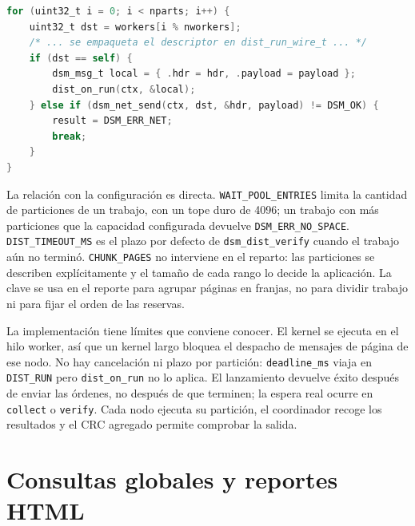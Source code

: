 \documentclass[11pt,spanish]{article}
\begin{document}
\begin{lstlisting}[language=C, caption={Reparto de particiones y ejecución local del coordinador.}, label={lst:dist}]
for (uint32_t i = 0; i < nparts; i++) {
    uint32_t dst = workers[i % nworkers];
    /* ... se empaqueta el descriptor en dist_run_wire_t ... */
    if (dst == self) {
        dsm_msg_t local = { .hdr = hdr, .payload = payload };
        dist_on_run(ctx, &local);
    } else if (dsm_net_send(ctx, dst, &hdr, payload) != DSM_OK) {
        result = DSM_ERR_NET;
        break;
    }
}
\end{lstlisting}

La relación con la configuración es directa. \texttt{WAIT\_POOL\_ENTRIES} limita la cantidad de particiones de un trabajo, con un tope duro de 4096; un trabajo con más particiones que la capacidad configurada devuelve \texttt{DSM\_ERR\_NO\_SPACE}. \texttt{DIST\_TIMEOUT\_MS} es el plazo por defecto de \texttt{dsm\_dist\_verify} cuando el trabajo aún no terminó. \texttt{CHUNK\_PAGES} no interviene en el reparto: las particiones se describen explícitamente y el tamaño de cada rango lo decide la aplicación. La clave se usa en el reporte para agrupar páginas en franjas, no para dividir trabajo ni para fijar el orden de las reservas.

La implementación tiene límites que conviene conocer. El kernel se ejecuta en el hilo worker, así que un kernel largo bloquea el despacho de mensajes de página de ese nodo. No hay cancelación ni plazo por partición: \texttt{deadline\_ms} viaja en \texttt{DIST\_RUN} pero \texttt{dist\_on\_run} no lo aplica. El lanzamiento devuelve éxito después de enviar las órdenes, no después de que terminen; la espera real ocurre en \texttt{collect} o \texttt{verify}. Cada nodo ejecuta su partición, el coordinador recoge los resultados y el CRC agregado permite comprobar la salida.

\section{Consultas globales y reportes HTML}\label{sec:reportes}
\end{document}
